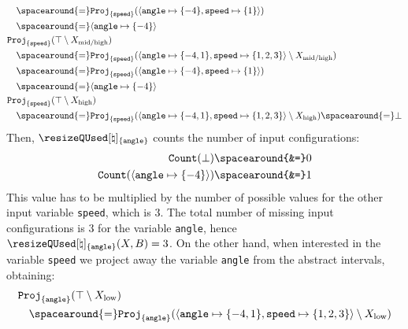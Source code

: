 \begin{example}
\begin{align*}
    &\quad\spacearound{=} \abstractdomainproject[{\{\texttt{speed}\}}](\langle \texttt{angle} \mapsto \{-4\}, \texttt{speed} \mapsto \{1\}\rangle) \\
    &\quad\spacearound{=} \langle \texttt{angle} \mapsto \{-4\} \rangle \\
    &\abstractdomainproject[{\{\texttt{speed}\}}](\abstractdomaintop \setminus \prefrombucket[\textup{mid\-/high}]) \\
    &\quad\spacearound{=} \abstractdomainproject[{\{\texttt{speed}\}}](\langle \texttt{angle} \mapsto \{-4, 1\}, \texttt{speed} \mapsto \{1, 2, 3\} \rangle \setminus \prefrombucket[\textup{mid\-/high}]) \\
    &\quad\spacearound{=} \abstractdomainproject[{\{\texttt{speed}\}}](\langle \texttt{angle} \mapsto \{-4\}, \texttt{speed} \mapsto \{1\}\rangle) \\
    &\quad\spacearound{=} \langle \texttt{angle} \mapsto \{-4\} \rangle \\
    &\abstractdomainproject[{\{\texttt{speed}\}}](\abstractdomaintop \setminus \prefrombucket[\textup{high}]) \\
    &\quad\spacearound{=} \abstractdomainproject[{\{\texttt{speed}\}}](\langle \texttt{angle} \mapsto \{-4, 1\}, \texttt{speed} \mapsto \{1, 2, 3\} \rangle \setminus \prefrombucket[\textup{high}]) \spacearound{=} \abstractdomainbottom
  \end{align*}
  Then, $\abstractqusedname_{\{\texttt{angle}\}}$ counts the number of input configurations:
  \begin{align*}
    \abstractdomaincount(\abstractdomainbottom) \spacearound{&=} 0 \\
    \abstractdomaincount(\langle \texttt{angle} \mapsto \{-4\} \rangle) \spacearound{&=} 1
  \end{align*}
  This value has to be multiplied by the number of possible values for the other input variable \texttt{speed}, which is $3$.
  The total number of missing input configurations is $3$ for the variable \texttt{angle}, hence $\abstractqusedname_{\{\texttt{angle}\}}(\presfrombuckets, \buckets) = 3$.
  On the other hand, when interested in the variable \texttt{speed} we project away the variable \texttt{angle} from the abstract intervals, obtaining:
  \begin{align*}
    &\abstractdomainproject[{\{\texttt{angle}\}}](\abstractdomaintop \setminus \prefrombucket[\textup{low}]) \\
    &\quad\spacearound{=} \abstractdomainproject[{\{\texttt{angle}\}}](\langle \texttt{angle} \mapsto \{-4, 1\}, \texttt{speed} \mapsto \{1, 2, 3\} \rangle \setminus \prefrombucket[\textup{low}]) \\

\end{align*}
\end{example}
